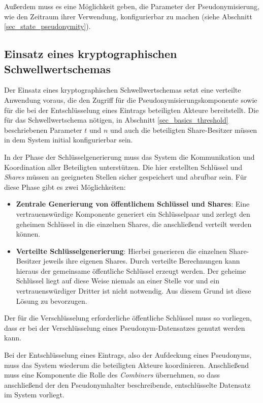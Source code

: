 Außerdem muss es eine Möglichkeit geben, die Parameter der Pseudonymisierung, wie den Zeitraum ihrer Verwendung, konfigurierbar zu machen (siehe Abschnitt \ref{sec_state_pseudonymity}).

\subsection{Einsatz eines kryptographischen Schwellwertschemas}

\label{subsec_impl_requirements_threshold}


Der Einsatz eines kryptographischen Schwellwertschemas setzt eine verteilte Anwendung voraus, die den Zugriff für die Pseudonymisierungskomponente sowie für die bei der Entschlüsselung eines Eintrags beteiligten Akteure bereitstellt. Die für das Schwellwertschema nötigen, in Abschnitt \ref{sec_basics_threshold} beschriebenen Parameter \(t\) und \(n\) und auch die beteiligten Share-Besitzer müssen in dem System initial konfigurierbar sein.

In der Phase der Schlüsselgenerierung muss das System die Kommunikation und Koordination aller Beteiligten unterstützen. Die hier erstellten Schlüssel und \textit{Shares} müssen an geeigneten Stellen sicher gespeichert und abrufbar sein. Für diese Phase gibt es zwei Möglichkeiten:
\begin{itemize}
  \item \textbf{Zentrale Generierung von öffentlichem Schlüssel und Shares}: Eine vertrauenswürdige Komponente generiert ein Schlüsselpaar und zerlegt den geheimen Schlüssel in die einzelnen Shares, die anschließend verteilt werden können. 
  \item \textbf{Verteilte Schlüsselgenerierung}: Hierbei generieren die einzelnen Share-Besitzer jeweils ihre eigenen Shares. Durch verteilte Berechnungen kann hieraus der gemeinsame öffentliche Schlüssel erzeugt werden. Der geheime Schlüssel liegt auf diese Weise niemals an einer Stelle vor und ein vertrauenswürdiger Dritter ist nicht notwendig. Aus diesem Grund ist diese Lösung zu bevorzugen.
\end{itemize}

Der für die Verschlüsselung erforderliche öffentliche Schlüssel muss so vorliegen, dass er bei der Verschlüsselung eines Pseudonym-Datensatzes genutzt werden kann.

Bei der Entschlüsselung eines Eintrags, also der Aufdeckung eines Pseudonyms, muss das System wiederum die beteiligten Akteure koordinieren. Anschließend muss eine Komponente die Rolle des \textit{Combiners} übernehmen, so dass anschließend der den Pseudonymhalter beschreibende, entschlüsselte Datensatz im System  vorliegt.

